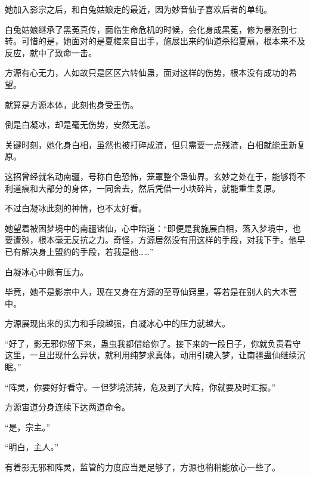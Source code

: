 \begin{this_body}
她加入影宗之后，和白兔姑娘走的最近，因为妙音仙子喜欢后者的单纯。

白兔姑娘继承了黑莬真传，面临生命危机的时候，会化身成黑莬，修为暴涨到七转。可惜的是，她面对的是夏槎亲自出手，施展出来的仙道杀招夏扇，根本来不及反应，就中了致命一击。

方源有心无力，人如故只是区区六转仙蛊，面对这样的伤势，根本没有成功的希望。

就算是方源本体，此刻也身受重伤。

倒是白凝冰，却是毫无伤势，安然无恙。

关键时刻，她化身白相，虽然也被打碎成渣，但只需要一点残渣，白相就能重新复原。

这招曾经就名动南疆，号称白色恐怖，笼罩整个蛊仙界。玄妙之处在于，能够将不利道痕和大部分的身体，一同舍去，然后凭借一小块碎片，就能重生复原。

不过白凝冰此刻的神情，也不太好看。

她望着被困梦境中的南疆诸仙，心中暗道：“即便是我施展白相，落入梦境中，也要遭殃，根本毫无反抗之力。奇怪，方源居然没有用这样的手段，对我下手。他早已有解决身上盟约的手段，若我是他……”

白凝冰心中颇有压力。

毕竟，她不是影宗中人，现在又身在方源的至尊仙窍里，等若是在别人的大本营中。

方源展现出来的实力和手段越强，白凝冰心中的压力就越大。

“好了，影无邪你留下来，蛊虫我都借给你了。接下来的一段日子，你就负责看守这里，一旦出现什么异状，就利用纯梦求真体，动用引魂入梦，让南疆蛊仙继续沉眠。”

“阵灵，你要好好看守。一但梦境流转，危及到了大阵，你就要及时汇报。”

方源宙道分身连续下达两道命令。

“是，宗主。”

“明白，主人。”

有着影无邪和阵灵，监管的力度应当是足够了，方源也稍稍能放心一些了。

\end{this_body}

